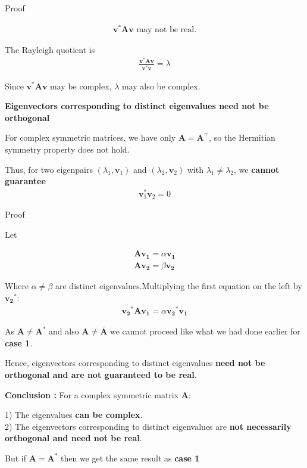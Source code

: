 \documentclass{beamer}
\numberwithin{equation}{section}
\theoremstyle{remark}
\let\vec\mathbf
\begin{document}
\begin{frame}{Proof}

\begin{align}
\vec{v}^* \vec{A} \vec{v} \text{ may not be real.}
\end{align}

The Rayleigh quotient is
\begin{align}
\frac{\vec{v}^* \vec{A} \vec{v}}{\vec{v}^* \vec{v}} = \lambda
\end{align}

Since $\vec{v}^* \vec{A} \vec{v}$ may be complex, $\lambda$ may also be complex.

\textbf{Eigenvectors corresponding to distinct eigenvalues need not be orthogonal}

For complex symmetric matrices, we have only $\vec{A} = \vec{A}^\top$, so the Hermitian symmetry property does not hold.

Thus, for two eigenpairs $(\lambda_1, \vec{v}_1)$ and $(\lambda_2, \vec{v}_2)$ with $\lambda_1 \ne \lambda_2$, we \textbf{cannot guarantee}
\begin{align}
\vec{v}_1^* \vec{v}_2 = 0
\end{align}

\end{frame}

\begin{frame}{Proof}

Let

\begin{align}
\vec{A}\vec{v_1} = \alpha \vec{v_1}\\
\vec{A}\vec{v_2} = \beta \vec{v_2}
\end{align}

Where $\alpha \ne \beta$ are distinct eigenvalues.Multiplying the first equation on the left by $\vec{v_2}^*$:
\begin{align}
\vec{v_2}^* \vec{A} \vec{v_1} = \alpha \vec{v_2}^* \vec{v_1}
\end{align}

As $\vec{A} \neq \vec{A}^*$ and also $\vec{A} \neq \bar{\vec{A}}$ we cannot proceed like what we had done earlier for \textbf{case 1}.

Hence, eigenvectors corresponding to distinct eigenvalues \textbf{need not be orthogonal and are not guaranteed to be real}.

\textbf{Conclusion :}  
For a complex symmetric matrix $\vec{A}$:

  1) The eigenvalues \textbf{can be complex}.\\
  2) The eigenvectors corresponding to distinct eigenvalues are \textbf{not necessarily orthogonal and need not be real}.

 
But if $\vec{A} = \vec{A}^*$ then we get the same result as \textbf{case 1}

\end{frame}
\end{document}
